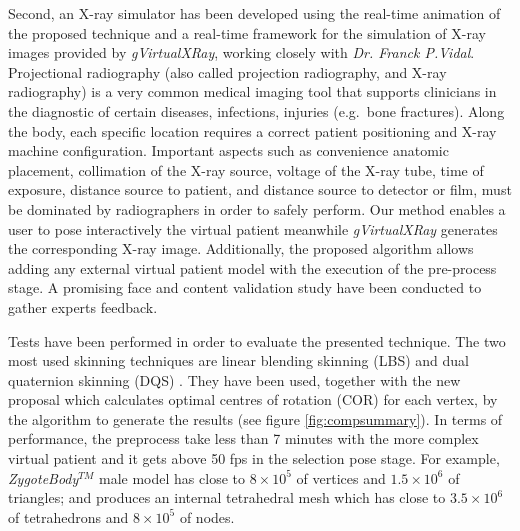 Second, an X-ray simulator has been developed using the real-time animation of the proposed technique and a real-time framework for the simulation of X-ray images provided by \emph{gVirtualXRay}, working closely with \emph{Dr. Franck P.Vidal}. Projectional radiography (also called projection radiography, and X-ray radiography) is a very common medical imaging tool that supports clinicians in the diagnostic of certain diseases, infections, injuries (e.g.~bone fractures). Along the body, each specific location requires a correct patient positioning and X-ray machine configuration. Important aspects such as convenience anatomic placement, collimation of the X-ray source, voltage of the X-ray tube, time of exposure, distance source to patient, and distance source to detector or film, must be dominated by radiographers in order to safely perform. Our method enables a user to pose interactively the virtual patient meanwhile \emph{gVirtualXRay} generates the corresponding X-ray image. Additionally, the proposed algorithm allows adding any external virtual patient model with the execution of the pre-process stage. A promising face and content validation study have been conducted to gather  experts feedback. %



Tests have been performed in order to evaluate the presented technique. The two most used skinning techniques are linear blending skinning (LBS) \cite{thalmann88} and dual quaternion skinning (DQS) \cite{Kavan2008}. They have been used, together with the new proposal which calculates optimal centres of rotation (COR) \cite{le2016real} for each vertex,  by the algorithm to generate the results (see figure \ref{fig:compsummary}). In terms of performance, the preprocess take less than 7 minutes with the more complex virtual patient and it gets above 50 fps in the selection pose stage. For example, \emph{ZygoteBody}$^{TM}$ male model has close to $8 \times 10^5$ of vertices and $1.5\times 10^6$ of triangles; and produces an internal tetrahedral mesh which has close to $3.5\times 10^6$ of tetrahedrons and $8 \times 10^5$ of nodes.


